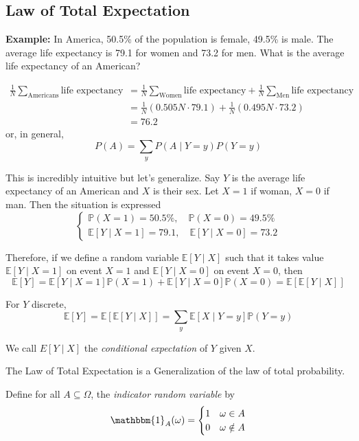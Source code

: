 \documentclass[12pt]{report}
\renewcommand{\P}{\mathbb{P}}
\newcommand{\E}{\mathbb{E}}
\newcommand{\ind}{\mathbbm{1}}
\newcommand{\sub}{\subseteq}
\begin{document}
\subsection*{Law of Total Expectation}
    \textbf{Example:} In America, 50.5\% of the population is female, 49.5\% is male. The average life expectancy is 79.1 for women and 73.2 for men. What is the average life expectancy of an American?

    \begin{align*}
        \frac{1}{N} \sum_{\text{Americans}} \text{life expectancy} &= \frac{1}{N} \sum_{\text{Women}} \text{life expectancy} + \frac{1}{N} \sum_{\text{Men}} \text{life expectancy}\\
        &= \frac{1}{N}(0.505N \cdot 79.1) + \frac{1}{N}(0.495N \cdot 73.2)\\
        &= 76.2
    \end{align*}
    or, in general, 
    \[P(A) = \sum_y P(A \; | \; Y = y)P(Y = y)\]

    This is incredibly intuitive but let's generalize. Say $Y$ is the average life expectancy of an American and $X$ is their sex. Let $X = 1$ if woman, $X =0$ if man. 
    Then the situation is expressed 
    \[\begin{cases}
        \P(X = 1) = 50.5\%, \quad \P(X = 0) = 49.5\%\\ 
        \E[Y \; | \; X = 1] = 79.1, \quad \E[Y \; | \; X = 0] = 73.2
    \end{cases}\]  


    Therefore, if we define a random variable $\E[Y \; | \; X]$ such that it takes value $\E[Y \; | \; X = 1]$ on event $X = 1$ and $\E[Y \; | \; X = 0]$ on event $X = 0$, then
    \[\E[Y] = \E[Y \; | \; X=1] \P(X = 1) + \E[Y \; | \; X = 0] \P(X = 0) = \E[\E[Y \; | \; X]]\]
    
    For $Y$ discrete, 
    \[\E[Y] = \E[\E[Y \; | \; X]] = \sum_y \E[X \; | \; Y = y] \P(Y = y)\]

    We call $E[Y \; | \; X]$ the \emph{conditional expectation} of $Y$ given $X$. 

    The Law of Total Expectation is a Generalization of the law of total probability. 

    Define for all $A \sub \Omega$, the \emph{indicator random variable} by
    \[\ind_{A}(\omega) = \begin{cases}
        1 & \omega \in A\\
        0 & \omega \notin A
    \end{cases}\]  
\end{document}
